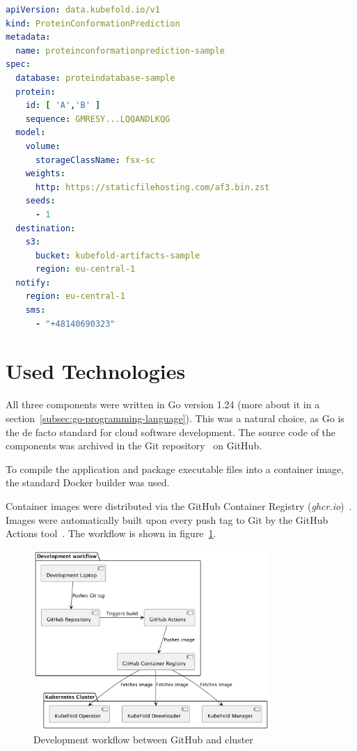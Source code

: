\begin{lstlisting}[language=yaml,caption={Przykładowy kod YAML zasobu ProteinConformationPrediction},label={lst:protein_conformation_prediction}]
apiVersion: data.kubefold.io/v1
kind: ProteinConformationPrediction
metadata:
  name: proteinconformationprediction-sample
spec:
  database: proteindatabase-sample
  protein:
    id: [ 'A','B' ]
    sequence: GMRESY...LQQANDLKQG
  model:
    volume:
      storageClassName: fsx-sc
    weights:
      http: https://staticfilehosting.com/af3.bin.zst
    seeds:
      - 1
  destination:
    s3:
      bucket: kubefold-artifacts-sample
      region: eu-central-1
  notify:
    region: eu-central-1
    sms:
      - "+48140690323"
\end{lstlisting}


\section{Used Technologies}
All three components were written in Go version 1.24 (more about it in a section~\ref{subsec:go-programming-language}).
This was a natural choice, as Go is the de facto standard for cloud software development.
The source code of the components was archived in the Git repository~\cite{git} on GitHub\cite{github}.

To compile the application and package executable files into a container image, the standard Docker builder was used.

Container images were distributed via the GitHub Container Registry (\textit{ghcr.io})~\cite{ghcr}.
Images were automatically built upon every push tag to Git by the GitHub Actions tool~\cite{github_actions}.
The workflow is shown in figure~\ref{fig:docker-images-flow}.

\begin{figure}[htbp]
    \centering
    \includegraphics[width=0.8\textwidth]{images/images}
    \caption{Development workflow between GitHub and cluster}
    \label{fig:docker-images-flow}
\end{figure}

